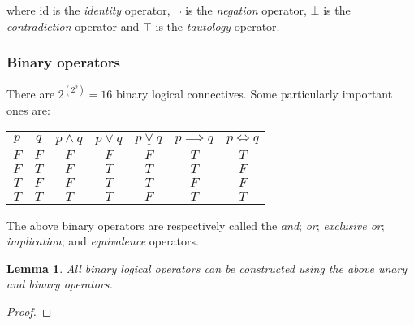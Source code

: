 \documentclass[12pt]{article}
\newtheorem{lemma}{Lemma}[theorem]
\begin{document}
where $\text{id}$ is the \emph{identity} operator, $\lnot$ is the \emph{negation} operator, $\bot$ is the \emph{contradiction} operator and $\top$ is the \emph{tautology} operator.

\subsubsection{Binary operators}

There are $2^{\left( 2^2 \right)} = 16$ binary logical connectives. Some particularly important ones are:

\begin{center}
\begin{tabular}{|c|c||c|c|c|c|c|}
\hline
$p$ & $q$ & $p \land q$ & $p \lor q$ & $p \underline{\lor} q$ & $p \implies q$ & $p \Longleftrightarrow q$ \\
\hhline{|=|=||=|=|=|=|=|}
$F$ & $F$ & $F$ & $F$ & $F$ & $T$ & $T$ \\
\hline
$F$ & $T$ & $F$ & $T$ & $T$ & $T$ & $F$ \\
\hline
$T$ & $F$ & $F$ & $T$ & $T$ & $F$ & $F$ \\
\hline
$T$ & $T$ & $T$ & $T$ & $F$ & $T$ & $T$ \\
\hline
\end{tabular}
\end{center}

The above binary operators are respectively called the \emph{and}; \emph{or}; \emph{exclusive or}; \emph{implication}; and \emph{equivalence} operators.

\begin{shaded}
\begin{lemma}
All binary logical operators can be constructed using the above unary and binary operators.
\end{lemma}

\begin{proof}

\end{proof}
\end{shaded}
\end{document}
